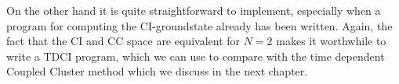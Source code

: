 \documentclass[a4paper,10pt, twocolumn]{article}
\begin{document}
On the other hand it is quite straightforward to implement, especially when a program for
computing the CI-groundstate already has been written. 
Again, the fact that the CI and CC space are equivalent for $N=2$ makes it worthwhile to write a TDCI program, 
which we can use to compare with the time dependent Coupled Cluster method which we discuss in the next chapter. 
\begin{comment}
\subsection{Coupled cluster theory}
In this section we review Coupled Cluster (CC) theory. 
We will look at the "classical" way of obtaining the CC equations. The presentation borrows heavily from the 
excellent review by Crawford and Schaefer\cite{Crawford2000}.

Furthermore we look at a different approach which in addition to the usual CC equations also 
gives a method to solve the time dependent Schrödinger equation, the so-called Orbital Adaptive Coupled Cluster (OATDCC) method\cite{Kvaal12}.

\subsubsection{The exponential ansatz}
As usual we start by considering the time-independent Schrödinger equation
\begin{equation*}
\hat{H} \ket{\Psi} = E\ket{\Psi}.
\end{equation*}
In Coupled Cluster theory an exponential ansatz 
\begin{equation}
\ket{\Psi}_{CC} \equiv e^{\hat{T}} \ket{\Phi} \label{ExponantialAnsatzCC},
\end{equation}
is used to approximate the exact solution. Here $\ket{\Phi}$ is a reference Slater determinant 
and $\hat{T} = \sum_{i}^n \hat{T}_i$ is the sum over n-orbital cluster operators. 

The the one- and two-orbital cluster operators are defined as
\begin{equation}
\hat{T}_1 \equiv \sum_{ia} t_i^a c_a^\dagger c_i
\end{equation}
and 
\begin{equation}
\hat{T}_2 \equiv \frac{1}{4} \sum_{ijab} t_{ij}^{ab} c_b^\dagger c_j c_a^\dagger c_i.
\end{equation}
Generally an n-orbital cluster operator is defined as 
\begin{equation}
\hat{T}_n \equiv \left(\frac{1}{n!}\right)^2 \sum_{ijk...abc...}t_{ijk...}^{abc...} ...c_c^\dagger c_k c_b^\dagger c_j c_a^\dagger   c_i.
\end{equation}
Recalling the exponential series we can write,
\begin{equation}
 \ket{\Psi}_{CC} = e^{\hat{T}} \ket{\Phi} = \left( 1+\sum_{k=1}^\infty \frac{1}{k!}\hat{T}^k \right) \ket{\Phi}. \label{CCansatzSeriesExpansion}
\end{equation}


\end{comment}
\end{document}
